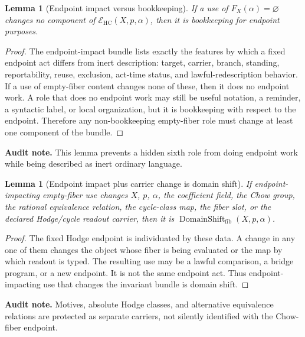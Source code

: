 \documentclass[11pt]{article}
\newtheorem{lemma}[theorem]{Lemma}
\newcommand{\HC}{\operatorname{HC}}
\begin{document}
\begin{lemma}[Endpoint impact versus bookkeeping]
If a use of $F_X(\alpha)=\varnothing$ changes no component of $\mathcal E_{\HC}(X,p,\alpha)$, then it is bookkeeping for endpoint purposes.
\end{lemma}
\begin{proof}
The endpoint-impact bundle lists exactly the features by which a fixed endpoint act differs from inert description: target, carrier, branch, standing, reportability, reuse, exclusion, act-time status, and lawful-redescription behavior. If a use of empty-fiber content changes none of these, then it does no endpoint work. A role that does no endpoint work may still be useful notation, a reminder, a syntactic label, or local organization, but it is bookkeeping with respect to the endpoint. Therefore any non-bookkeeping empty-fiber role must change at least one component of the bundle.
\end{proof}
\par\noindent\textbf{Audit note.} This lemma prevents a hidden sixth role from doing endpoint work while being described as inert ordinary language.

\begin{lemma}[Endpoint impact plus carrier change is domain shift]
If endpoint-impacting empty-fiber use changes $X$, $p$, $\alpha$, the coefficient field, the Chow group, the rational equivalence relation, the cycle-class map, the fiber slot, or the declared Hodge/cycle readout carrier, then it is $\operatorname{DomainShift}_{\mathrm{fib}}(X,p,\alpha)$.
\end{lemma}
\begin{proof}
The fixed Hodge endpoint is individuated by these data. A change in any one of them changes the object whose fiber is being evaluated or the map by which readout is typed. The resulting use may be a lawful comparison, a bridge program, or a new endpoint. It is not the same endpoint act. Thus endpoint-impacting use that changes the invariant bundle is domain shift.
\end{proof}
\par\noindent\textbf{Audit note.} Motives, absolute Hodge classes, and alternative equivalence relations are protected as separate carriers, not silently identified with the Chow-fiber endpoint.
\end{document}
